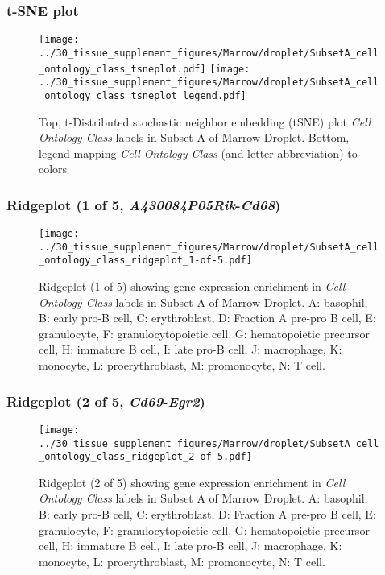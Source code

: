 \clearpage
\subsubsection{t-SNE plot}
\begin{figure}[h]
\centering
\texttt{[image: ../30\_tissue\_supplement\_figures/Marrow/droplet/SubsetA\_cell\_ontology\_class\_tsneplot.pdf]}
\texttt{[image: ../30\_tissue\_supplement\_figures/Marrow/droplet/SubsetA\_cell\_ontology\_class\_tsneplot\_legend.pdf]}
\caption{Top, t-Distributed stochastic neighbor embedding (tSNE) plot  \emph{Cell Ontology Class} labels in Subset A of Marrow Droplet. Bottom, legend mapping \emph{Cell Ontology Class} (and letter abbreviation) to colors}
\end{figure}


\clearpage

\subsubsection{Ridgeplot (1 of 5, \emph{A430084P05Rik}-\emph{Cd68})}
\begin{figure}[h]
\centering
\texttt{[image: ../30\_tissue\_supplement\_figures/Marrow/droplet/SubsetA\_cell\_ontology\_class\_ridgeplot\_1-of-5.pdf]}

\caption{ Ridgeplot (1 of 5)  showing gene expression enrichment in \emph{Cell Ontology Class} labels in Subset A of Marrow Droplet. A: basophil, B: early pro-B cell, C: erythroblast, D: Fraction A pre-pro B cell, E: granulocyte, F: granulocytopoietic cell, G: hematopoietic precursor cell, H: immature B cell, I: late pro-B cell, J: macrophage, K: monocyte, L: proerythroblast, M: promonocyte, N: T cell.}
\end{figure}


\clearpage

\subsubsection{Ridgeplot (2 of 5, \emph{Cd69}-\emph{Egr2})}
\begin{figure}[h]
\centering
\texttt{[image: ../30\_tissue\_supplement\_figures/Marrow/droplet/SubsetA\_cell\_ontology\_class\_ridgeplot\_2-of-5.pdf]}

\caption{ Ridgeplot (2 of 5)  showing gene expression enrichment in \emph{Cell Ontology Class} labels in Subset A of Marrow Droplet. A: basophil, B: early pro-B cell, C: erythroblast, D: Fraction A pre-pro B cell, E: granulocyte, F: granulocytopoietic cell, G: hematopoietic precursor cell, H: immature B cell, I: late pro-B cell, J: macrophage, K: monocyte, L: proerythroblast, M: promonocyte, N: T cell.}
\end{figure}


